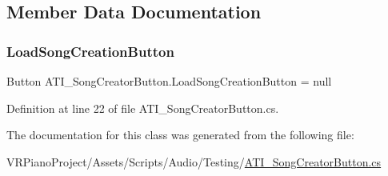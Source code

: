 \subsection{Member Data Documentation}
\mbox{\label{class_a_t_i___song_creator_button_af47eac9d1ed3a74d49a511fdbd57ff3e}} 
\subsubsection{\texorpdfstring{Load\+Song\+Creation\+Button}{LoadSongCreationButton}}
{\footnotesize\ttfamily Button A\+T\+I\+\_\+\+Song\+Creator\+Button.\+Load\+Song\+Creation\+Button = null\hspace{0.3cm}{\ttfamily [private]}}



Definition at line 22 of file A\+T\+I\+\_\+\+Song\+Creator\+Button.\+cs.



The documentation for this class was generated from the following file\+:\begin{DoxyCompactItemize}
\item 
V\+R\+Piano\+Project/\+Assets/\+Scripts/\+Audio/\+Testing/\hyperlink{_a_t_i___song_creator_button_8cs}{A\+T\+I\+\_\+\+Song\+Creator\+Button.\+cs}\end{DoxyCompactItemize}
